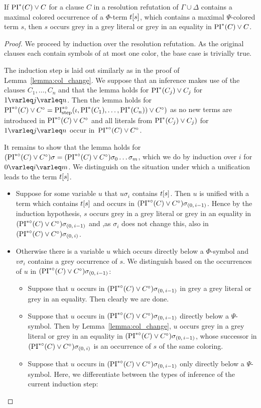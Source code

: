 \documentclass[,%
	draft=false,%
	numbers=noendperiod
	12pt,
	a4paper,
	oneside,%
	openany,
]{memoir}
\newcommand{\inv}{\ensuremath{\PIstarnosigma(C)\lor C\nosigma}}
\newcommand{\invp}{\ensuremath{(\inv)}}
\begin{document}
\begin{lemma}
	\label{lemma:subterm_in_grey_lit_star}
	If $\operatorname{PI}^*(C) \lor C$ for a clause $C$ in a resolution refutation of $\Gamma \cup \Delta$ contains a maximal colored occurrence of a $\Phi$-term $t[s]$, which contains a maximal $\Psi$-colored term $s$, then $s$ occurs grey in a grey literal or grey in an equality in $\operatorname{PI}^*(C) \lor C$.
\end{lemma}
\begin{proof}
	We proceed by induction over the resolution refutation.
	As the original clauses each contain symbols of at most one color, the base case is trivially true.

	The induction step is laid out similarly as in the proof of Lemma~\ref{lemma:col_change}. 
	We suppose that an inference makes use of the clauses $C_1, \dots, C_n$ and that the lemma holds for $\operatorname{PI}^*(C_j) \lor C_j$ for $1\varleq j \varleq n$. 
	Then the lemma holds for $\inv = \PIstepstarnosigma(\inference, \PI^*(C_1), \dots, \PI^*(C_n)) \lor C\nosigma)$ as no new terms are introduced in $\inv$ and all literals from $\operatorname{PI}^*(C_j) \lor C_j)$ for $1\varleq j \varleq n$ occur in~$\inv$.

	It remains to show that the lemma holds for $\invp\sigma = \invp\sigma_0 \quantifierdots \sigma_m$, which we do by induction over $i$ for $0 \varleq i \varleq m$.
	We distinguish on the situation under which a unification leads to the term $t[s]$.

	\begin{itemize}
		\item 
			Suppose for some variable $u$ that $u\sigma_i$ contains $t[s]$. 
			Then $u$ is unified with a term which contains $t[s]$ and occurs in $\invp\sigmazmi$.
			Hence by the induction hypothesis, $s$ occurs grey in a grey literal or grey in an equality in $\invp\sigmazmi$ and ,as $\sigma_i$ does not change this, also in $\invp\sigmazi$.

		\item 
			Otherwise there is a variable $u$ which occurs directly below a $\Phi$-symbol and $v\sigma_i$ contains a grey occurrence of $s$.
			We distinguish based on the occurrences of $u$ in $\invp\sigmazmi$:

			\begin{itemize}
				\item Suppose that $u$ occurs in $\invp\sigmazmi$ in grey a grey literal or grey in an equality. Then clearly we are done.
				\item Suppose that $u$ occurs in $\invp\sigmazmi$ directly below a $\Psi$-symbol.
					Then by Lemma~\ref{lemma:col_change}, $u$ occurs grey in a grey literal or grey in an equality in $\invp\sigmazmi$, whose successor in $\invp\sigmazi$ is an occurrence of $s$ of the same coloring.
				\item Suppose that $u$ occurs in $\invp\sigmazmi$ only directly below a $\Psi$-symbol.
					Here, we differentiate between the types of inference of the current induction step:


\end{itemize}
\end{itemize}
\end{proof}
\end{document}
